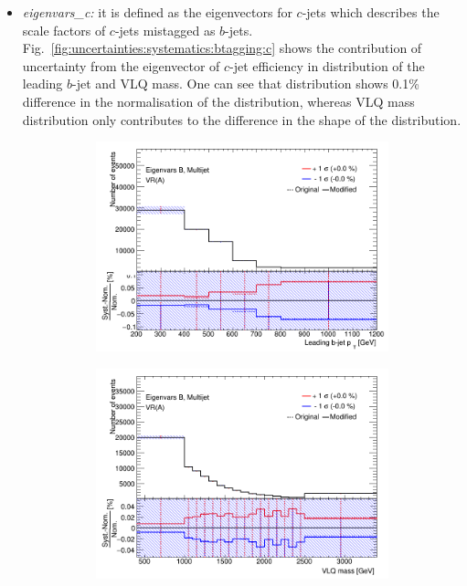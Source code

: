 \begin{itemize}
	\item \textit{eigenvars\_c:} it is defined as the eigenvectors for $c$-jets which describes the scale factors of $c$-jets mistagged as $b$-jets. Fig.\ \ref{fig:uncertainties:systematics:btagging:c} shows the contribution of uncertainty from the eigenvector of $c$-jet efficiency in \pt distribution of the leading $b$-jet and VLQ mass. One can see that \pt distribution shows 0.1\% difference in the normalisation of the distribution, whereas VLQ mass distribution only contributes to the difference in the shape of the distribution.
	\begin{figure}[hbt!]
		\centering
		\graphicspath{{figs/chapter6/Systematics/EigenvarsC/}}
		\begin{subfigure}{.35\textwidth}
			\centering
			\includegraphics[width=\linewidth,height=\textheight,keepaspectratio]{VR_B_jet_pt_Multijets.png}
			\caption{}
			\label{fig:uncertainties:systematics:btagging:c:jetpt}
		\end{subfigure}\hspace{0.6cm}
		\begin{subfigure}{.35\textwidth}
			\centering
			\includegraphics[width=\linewidth,height=\textheight,keepaspectratio]{VR_B_VLQM_Multijets.png}

\end{subfigure}
\end{figure}
\end{itemize}
